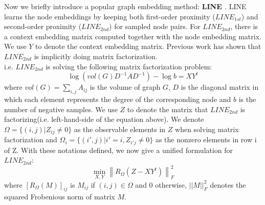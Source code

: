 \documentclass{acmtog} %
\begin{document}
Now we briefly introduce a popular graph embedding method: {\bfseries LINE \cite{Line}}. LINE learns the node embeddings by keeping both first-order proximity ($LINE_{1st}$) and second-order proximity ($LINE_{2nd}$) for sampled node pairs. For $LINE_{2nd}$, there is a context embedding matrix computed together
with the node embedding matrix. We use $Y$ to denote the context embedding matrix. Previous work \cite{Matrix} has shown that $LINE_{2nd}$ is implicitly doing matrix factorization.\\
\indent i.e. $LINE_{2nd}$ is solving the following matrix factorization problem:
\begin{equation}
\log (vol(G)D^{-1}AD^{-1})-\log b = XY^{t}
\end{equation}\label{fac}
where $vol(G) =\sum_{i,j} A_{ij}$ is the volume of graph $G$, $D$ is the diagonal matrix in which each element represents the degree of the corresponding node and $b$ is the number of negative samples. We use $Z$ to denote the matrix that $LINE_{2nd}$ is factorizing(i.e. left-hand-side of the equation above). We
denote $\Omega = \{(i,j)|Z_{ij} \ne 0\}$ as the observable elements in $Z$ when solving matrix factorization and $\Omega _i = \{(i', j) | i'=i, Z_{i'j}\ne 0\}$ as the nonzero elements in row i of Z. With these notations defined,
we now give a unified formulation for $LINE_{2nd}$:
\begin{equation}
\min _ { X , Y } \left\| R _ { \Omega } \left( Z - X Y ^ { t } \right) \right\| _ { F } ^ { 2 }
\end{equation}
where $[R_{\Omega}(M)]_{ij}$ is $M_{ij}$ if $(i,j)\in\Omega$ and $0$ otherwise, $||M||_F^2$ denotes the squared Frobenious norm
of matrix $M$.
\end{document}
